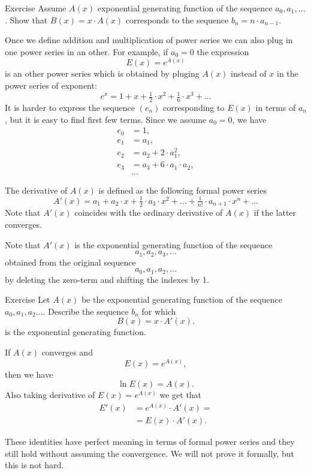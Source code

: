 \begin{thm}{Exercise}
Assume $A(x)$ exponential generating function of the sequence $a_0,a_1,\dots$.
Show that $B(x)=x\cdot A(x)$ corresponds to the sequence $b_n=n\cdot a_{n-1}$.
\end{thm}


Once we define addition and multiplication of power series we can also plug in one power series in an other.
For example, if $a_0=0$ the expression 
\[E(x)=e^{A(x)}\] is an other power series which is obtained by pluging $A(x)$ instead of $x$ in the power series of exponent:
\[e^x=1+x+\tfrac12\cdot x^2+\tfrac16\cdot x^3+\dots\]
It is harder to express the sequence $(e_n)$ corresponding to $E(x)$ in terms of $a_n$, but it is easy to find first few terms.
Since we assume $a_0=0$, we have
\begin{align*}
e_0&=1,
\\
e_1&=a_1,
\\
e_2&=a_2+2\cdot a_1^2,
\\
e_3&=a_3+6\cdot a_1\cdot a_2,
\\
&\dots
\end{align*}

The derivative of $A(x)$ is defined as the following formal power series 
\[A'(x)=a_1+a_2\cdot x+\tfrac12\cdot a_3\cdot x^2+\dots+\tfrac1{n!}\cdot a_{n+1}\cdot x^n+\dots\]
Note that $A'(x)$ coincides with the ordinary derivative of $A(x)$ if the latter converges.

Note that $A'(x)$ is the exponential generating function of the sequence 
\[a_1,a_2,a_3,\dots\]
obtained from the original sequence 
\[a_0,a_1,a_2,\dots\]
by deleting the zero-term and shifting the indexes by 1.


\begin{thm}{Exercise}
Let $A(x)$ be the exponential generating function of the sequence $a_0,a_1,a_2\dots$.
Describe the sequence $b_n$ for which 
\[B(x)=x\cdot A'(x).\]
is the exponential generating function.
\end{thm}

If $A(x)$ converges and
\[E(x)=e^{A(x)},\] 
then we have 
\[\ln E(x)=A(x).\]
Also taking derivative of $E(x)=e^{A(x)}$ we get  that
\begin{align*}
E'(x)
&=e^{A(x)}\cdot A'(x)=
\\
&= E(x)\cdot A'(x).
\end{align*}


These identities have perfect meaning in terms of formal power series
and they still hold without assuming the convergence.
We will not prove it formally, but this is not hard.

